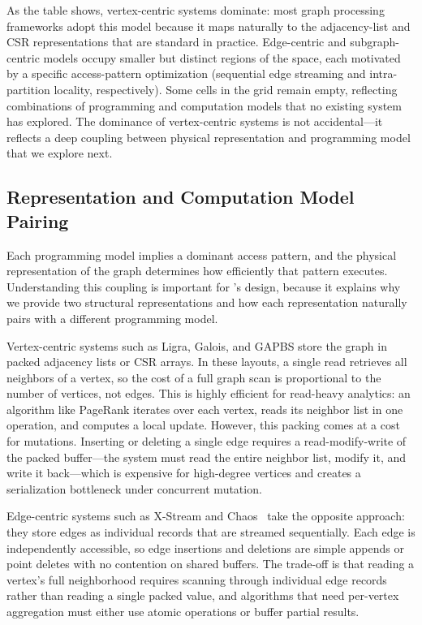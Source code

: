 As the table shows, vertex-centric systems dominate: most graph processing frameworks adopt this model because it maps naturally to the adjacency-list and CSR representations that are standard in practice.
Edge-centric and subgraph-centric models occupy smaller but distinct regions of the space, each motivated by a specific access-pattern optimization (sequential edge streaming and intra-partition locality, respectively).
Some cells in the grid remain empty, reflecting combinations of programming and computation models that no existing system has explored.
The dominance of vertex-centric systems is not accidental---it reflects a deep coupling between physical representation and programming model that we explore next.

\subsection{Representation and Computation Model Pairing}
\label{design:rep_comp_pairing}

Each programming model implies a dominant access pattern, and the physical representation of the graph determines how efficiently that pattern executes.
Understanding this coupling is important for \project{}'s design, because it explains why we provide two structural representations and how each representation naturally pairs with a different programming model.

Vertex-centric systems such as Ligra, Galois, and GAPBS store the graph in packed adjacency lists or CSR arrays.
In these layouts, a single read retrieves all neighbors of a vertex, so the cost of a full graph scan is proportional to the number of vertices, not edges.
This is highly efficient for read-heavy analytics: an algorithm like PageRank iterates over each vertex, reads its neighbor list in one operation, and computes a local update.
However, this packing comes at a cost for mutations.
Inserting or deleting a single edge requires a read-modify-write of the packed buffer---the system must read the entire neighbor list, modify it, and write it back---which is expensive for high-degree vertices and creates a serialization bottleneck under concurrent mutation.

Edge-centric systems such as X-Stream and Chaos~\cite{royChaos2015} take the opposite approach: they store edges as individual records that are streamed sequentially.
Each edge is independently accessible, so edge insertions and deletions are simple appends or point deletes with no contention on shared buffers.
The trade-off is that reading a vertex's full neighborhood requires scanning through individual edge records rather than reading a single packed value, and algorithms that need per-vertex aggregation must either use atomic operations or buffer partial results.

